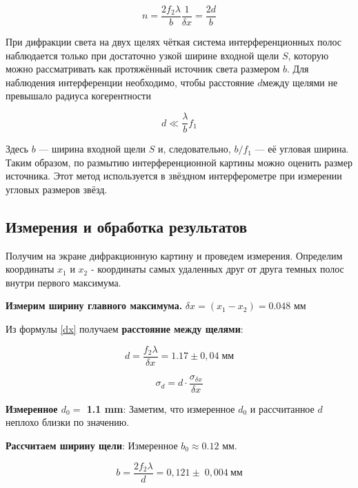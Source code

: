 \begin{equation}\label{n}
n = \dfrac{2f_2 \lambda}{b} \dfrac{1}{\delta x} = \dfrac{2d}{b}
\end{equation}

При дифракции света на двух щелях чёткая система интерференционных полос наблюдается только при достаточно узкой ширине входной щели $ S $, которую можно рассматривать как протяжённый источник света размером $ b $. Для наблюдения интерференции необходимо, чтобы расстояние $ d $между щелями не превышало радиуса когерентности

\begin{equation}\label{}
d \ll \dfrac{\lambda}{b} f_1
\end{equation}

Здесь $ b $ --- ширина входной щели $ S $ и, следовательно, $  b/f_1 $ --- её угловая ширина. Таким образом, по размытию интерференционной картины можно оценить размер источника. Этот метод используется в звёздном интерферометре при измерении угловых размеров звёзд.

\subsection{Измерения и обработка результатов}

Получим на экране дифракционную картину и проведем измерения. Определим координаты $x_1$ и $x_2$ - координаты самых удаленных друг от друга темных полос внутри первого максимума.



 \textbf{Измерим ширину главного максимума.}
 \newline
 $  \delta x  = (x_{1} - x_{2} )= 0.048 $ мм

 Из формулы \eqref{dx} получаем \textbf{расстояние между щелями}:
 
 \[d = \dfrac{f_2 \lambda}{\delta x} = 1.17 \pm 0,04 \; \text{мм}\]
 
 \[ \sigma_d = d\cdot \frac{\sigma_{\delta x}}{\delta x}       \]
 
 \textbf{Измеренное $d_0 = $ 1.1 mm}:
\newline
 Заметим, что измеренное $d_0$ и рассчитанное $d$ неплохо близки по значению.
 
\textbf{Рассчитаем ширину щели}:
\newline
Измеренное $b_0 \approx 0.12$ \: мм.
 
 \begin{equation}\label{}
 b = \dfrac{2 f_2 \lambda}{d} = 0,121 \pm \;0,004 \: \text{мм}
 \end{equation}
 
